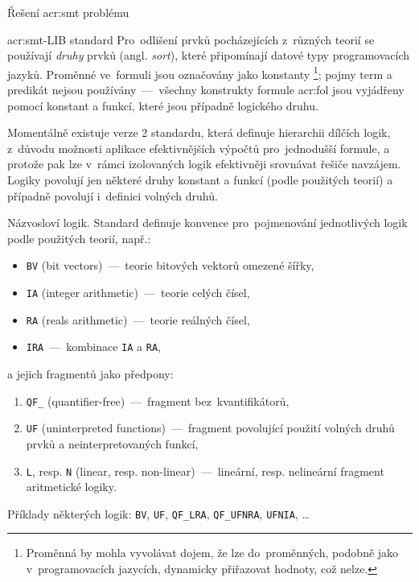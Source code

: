 \documentclass[thesis=M,czech]{FITthesis}[2012/06/26]
\newcommand{\acrlabel}[1]{acr:#1}
\newcommand{\acr}[1]{\acrshort{\acrlabel{#1}}}
\newcommand{\id}[1]{\texttt{#1}}
\newcommand{\hl}[1]{\textit{#1}}
\newcommand{\name}[1]{\hl{#1}}
\begin{document}
\begin{section}{Řešení \acr{smt} problému}
\begin{subsection}{\acr{smt}-LIB standard}
Pro~odlišení prvků pocházejících z~různých teorií
se používají \name{druhy} prvků (angl. \name{sort}),
které připomínají datové typy programovacích jazyků.
Proměnné ve~formuli jsou označovány jako konstanty%
\footnote{Proměnná by mohla vyvolávat dojem,
že lze do~proměnných, podobně jako v~programovacích jazycích,
dynamicky přiřazovat hodnoty, což nelze.};
pojmy term a predikát
nejsou používány~---~všechny konstrukty
formule \acr{fol} jsou vyjádřeny
pomocí konstant a funkcí,
které jsou případně logického druhu.

Momentálně existuje verze 2 standardu,
která definuje hierarchii dílčích logik,
z~důvodu možnosti aplikace efektivnějších výpočtů pro~jednodušší formule,
a protože pak lze v~rámci izolovaných logik
efektivněji srovnávat řešiče navzájem.
Logiky povolují jen některé druhy konstant a funkcí
(podle použitých teorií)
a případně povolují i~definici volných druhů.


\begin{paragraph}{Názvosloví logik.}\label{p:search:smt:smtlib:name}
Standard definuje konvence pro~pojmenování jednotlivých logik
podle použitých teorií, např.:
\begin{itemize}
\item \id{BV} (bit vectors)~---~teorie bitových vektorů omezené šířky,
\item \id{IA} (integer arithmetic)~---~teorie celých čísel,
\item \id{RA} (reals arithmetic)~---~teorie reálných čísel,
\item \id{IRA}~---~kombinace \id{IA} a \id{RA},
\end{itemize}
a jejich fragmentů jako předpony:
\begin{enumerate}
\item \id{QF\_} (quantifier-free)~---~fragment bez~kvantifikátorů,
\item \id{UF} (uninterpreted functions)~---~fragment povolující
   použití volných druhů prvků a neinterpretovaných funkcí,
\item \id{L}, resp. \id{N} (linear, resp. non-linear)~---~lineární,
   resp. nelineární fragment aritmetické logiky.
\end{enumerate}

Příklady některých logik:
\id{BV}, \id{UF}, \id{QF\_\-LRA}, \id{QF\_\-UFNRA}, \id{UFNIA}, \dots
\end{paragraph} %



\end{subsection}
\end{section}
\end{document}
